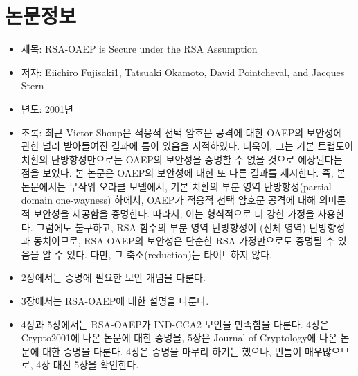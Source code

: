 \section{논문정보}

\begin{itemize}
	\item 제목: RSA-OAEP is Secure under the RSA Assumption
	\item 저자: Eiichiro Fujisaki1, Tatsuaki Okamoto, David Pointcheval, and Jacques Stern
	\item 년도: 2001년
	\item 초록: 최근 Victor Shoup은 적응적 선택 암호문 공격에 대한 OAEP의 보안성에 관한 널리
	받아들여진 결과에 틈이 있음을 지적하였다. 더욱이, 그는 기본 트랩도어 치환의
	단방향성만으로는 OAEP의 보안성을 증명할 수 없을 것으로 예상된다는 점을 보였다.
	본 논문은 OAEP의 보안성에 대한 또 다른 결과를 제시한다. 즉, 본 논문에서는 무작위
	오라클 모델에서, 기본 치환의 부분 영역 단방향성(partial-domain one-wayness)
	하에서, OAEP가 적응적 선택 암호문 공격에 대해 의미론적 보안성을 제공함을
	증명한다. 따라서, 이는 형식적으로 더 강한 가정을 사용한다. 그럼에도 불구하고,
	RSA 함수의 부분 영역 단방향성이 (전체 영역) 단방향성과 동치이므로, RSA-OAEP의
	보안성은 단순한 RSA 가정만으로도 증명될 수 있음을 알 수 있다. 다만, 그
	축소(reduction)는 타이트하지 않다.
\end{itemize}

\begin{itemize}
	\item 2장에서는 증명에 필요한 보안 개념을 다룬다.
	\item 3장에서는 RSA-OAEP에 대한 설명을 다룬다.
	\item 4장과 5장에서는 RSA-OAEP가 IND-CCA2 보안을 만족함을 다룬다. 4장은
	Crypto2001에 나온 논문에 대한 증명을, 5장은 Journal of Cryptology에 나온
	논문에 대한 증명을 다룬다. 4장은 증명을 마무리 하기는 했으나, 빈틈이
	매우많으므로, 4장 대신 5장을 확인한다.
\end{itemize}